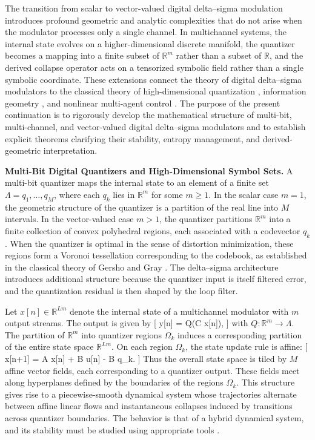 The transition from scalar to vector-valued digital delta–sigma modulation introduces profound geometric and analytic complexities that do not arise when the modulator processes only a single channel. In multichannel systems, the internal state evolves on a higher-dimensional discrete manifold, the quantizer becomes a mapping into a finite subset of $\mathbb{R}^{m}$ rather than a subset of $\mathbb{R}$, and the derived collapse operator acts on a tensorized symbolic field rather than a single symbolic coordinate. These extensions connect the theory of digital delta–sigma modulators to the classical theory of high-dimensional quantization \cite{gershogray1991vectorquantization}, information geometry \cite{amari2016informationgeometry}, and nonlinear multi-agent control \cite{slotineli1991applied, lohmillerslotine1998contraction}. The purpose of the present continuation is to rigorously develop the mathematical structure of multi-bit, multi-channel, and vector-valued digital delta–sigma modulators and to establish explicit theorems clarifying their stability, entropy management, and derived-geometric interpretation.

\medskip

\textbf{Multi-Bit Digital Quantizers and High-Dimensional Symbol Sets.}
A multi-bit quantizer maps the internal state to an element of a finite set $\Lambda = {q_{1},\ldots,q_{M}}$, where each $q_{k}$ lies in $\mathbb{R}^{m}$ for some $m \ge 1$. In the scalar case $m=1$, the geometric structure of the quantizer is a partition of the real line into $M$ intervals. In the vector-valued case $m>1$, the quantizer partitions $\mathbb{R}^{m}$ into a finite collection of convex polyhedral regions, each associated with a codevector $q_{k}$. When the quantizer is optimal in the sense of distortion minimization, these regions form a Voronoi tessellation corresponding to the codebook, as established in the classical theory of Gersho and Gray \cite{gershogray1991vectorquantization}. The delta–sigma architecture introduces additional structure because the quantizer input is itself filtered error, and the quantization residual is then shaped by the loop filter.

Let $x[n] \in \mathbb{R}^{L m}$ denote the internal state of a multichannel modulator with $m$ output streams. The output is given by
[
y[n] = Q(C x[n]),
]
with $Q : \mathbb{R}^{m} \to \Lambda$. The partition of $\mathbb{R}^{m}$ into quantizer regions $\Omega_{k}$ induces a corresponding partition of the entire state space $\mathbb{R}^{Lm}$. On each region $\Omega_{k}$, the state update rule is affine:
[
x[n+1] = A x[n] + B u[n] - B q_{k}.
]
Thus the overall state space is tiled by $M$ affine vector fields, each corresponding to a quantizer output. These fields meet along hyperplanes defined by the boundaries of the regions $\Omega_{k}$. This structure gives rise to a piecewise-smooth dynamical system whose trajectories alternate between affine linear flows and instantaneous collapses induced by transitions across quantizer boundaries. The behavior is that of a hybrid dynamical system, and its stability must be studied using appropriate tools \cite{khalil2002nonlinear, slotineli1991applied}.

